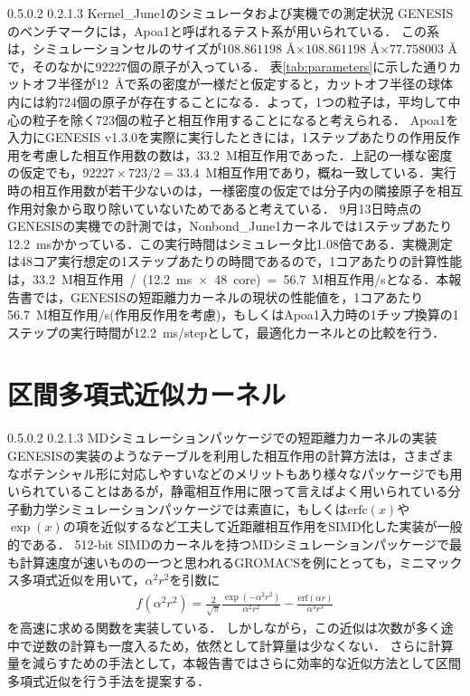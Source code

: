 \documentclass[uplatex,11pt,a4j,titlepage,oneside,openright,dvipdfmx]{jsbook}
\makeatletter
\renewcommand{\section}{%
   \@startsection{section}{1}{\z@}%
   {0.5\Cvs \@plus.0\Cdp \@minus.2\Cdp}%
   {0.2\Cvs \@plus.1\Cdp \@minus.3\Cdp}%
   {\reset@font\large\bfseries}}%
\makeatother
\begin{document}
 \section{Kernel\_June1のシミュレータおよび実機での測定状況} \label{sec:current_situation}
 GENESISのベンチマークには，Apoa1と呼ばれるテスト系が用いられている．
 この系は，シミュレーションセルのサイズが$108.861198$ \AA $\times 108.861198$ \AA $\times 77.758003$ \AA で，そのなかに\mbox{92227個}の原子が入っている．
 表\ref{tab:parameters}に示した通りカットオフ半径が\mbox{12 \AA}で系の密度が一様だと仮定すると，カットオフ半径の球体内には約724個の原子が存在することになる．よって，1つの粒子は，平均して中心の粒子を除く\mbox{723個}の粒子と相互作用することになると考えられる．
 Apoa1を入力にGENESIS v1.3.0を実際に実行したときには，1ステップあたりの作用反作用を考慮した相互作用数の数は，\mbox{33.2 M相互作用}であった．上記の一様な密度の仮定でも，\mbox{$92227 \times 723 / 2 = 33.4$ M相互作用}であり，概ね一致している．実行時の相互作用数が若干少ないのは，一様密度の仮定では分子内の隣接原子を相互作用対象から取り除いていないためであると考えている．
 9月13日時点のGENESISの実機での計測では，Nonbond\_June1カーネルでは1ステップあたり\mbox{12.2 ms}かかっている．この実行時間はシミュレータ比1.08倍である．実機測定は48コア実行想定の1ステップあたりの時間であるので，1コアあたりの計算性能は，\mbox{33.2 M相互作用 / (12.2 ms $\times$ 48 core) = 56.7 M相互作用/s}となる．本報告書では，GENESISの短距離力カーネルの現状の性能値を，1コアあたり\mbox{56.7 M相互作用/s}(作用反作用を考慮)，もしくはApoa1入力時の1チップ換算の1ステップの実行時間が\mbox{12.2 ms/step}として，最適化カーネルとの比較を行う．

 \chapter{区間多項式近似カーネル} \label{chapter:poly}
\section{MDシミュレーションパッケージでの短距離力カーネルの実装}
GENESISの実装のようなテーブルを利用した相互作用の計算方法は，さまざまなポテンシャル形に対応しやすいなどのメリットもあり様々なパッケージでも用いられていることはあるが，静電相互作用に限って言えばよく用いられている分子動力学シミュレーションパッケージでは素直に，もしくは$\mbox{erfc}(x)$や$\exp(x)$の項を近似するなど工夫して近距離相互作用をSIMD化した実装が一般的である．
512-bit SIMDのカーネルを持つMDシミュレーションパッケージで最も計算速度が速いものの一つと思われるGROMACSを例にとっても，ミニマックス多項式近似を用いて，$\alpha^2 r^2$を引数に
\begin{eqnarray} \label{eq:gromacs_approx}
f(\alpha^2 r^2) = \frac{2}{\sqrt{\pi}} \frac{\exp(-\alpha^2 r^2)}{\alpha^2 r^2} - \frac{\mathrm{erf}(\alpha r)}{\alpha^3 r^3}
\end{eqnarray}
を高速に求める関数を実装している．
しかしながら，この近似は次数が多く途中で逆数の計算も一度入るため，依然として計算量は少なくない．
さらに計算量を減らすための手法として，本報告書ではさらに効率的な近似方法として区間多項式近似を行う手法を提案する．
\end{document}
